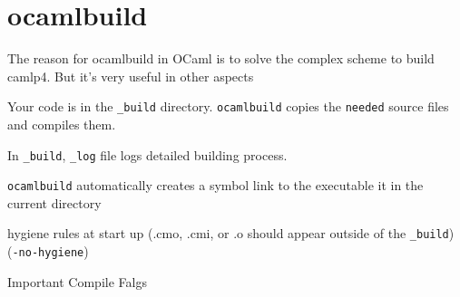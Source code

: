 
\section{ocamlbuild}

The reason for ocamlbuild in OCaml is to solve the complex scheme to
build camlp4. But it's very useful in other aspects

Your code is in the \verb|_build| directory. \verb|ocamlbuild| copies
the \verb|needed| source files and compiles them.

In \verb|_build|, \verb|_log| file logs detailed building process.

\verb|ocamlbuild| automatically creates a symbol link to the executable it
  in the current directory

hygiene rules at start up (.cmo, .cmi, or .o should appear
outside of the \verb|_build|) (\verb|-no-hygiene|)


Important Compile Falgs 

